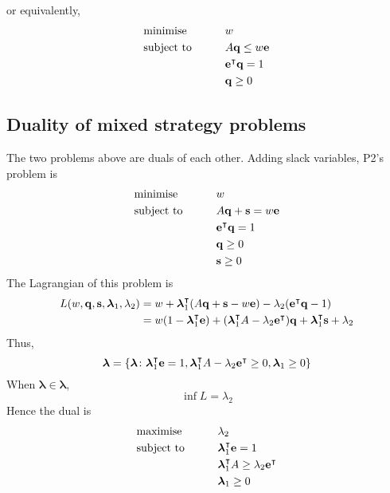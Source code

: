 or equivalently,
\begin{alignat*}{2}
	 & \text{minimise}   & \qquad & w                          \\
	 & \text{subject to} &        & A \vb q \leq w \vb e       \\
	 &                   &        & \vb e^\intercal \vb q = 1 \\
	 &                   &        & \vb q \geq 0
\end{alignat*}

\subsection{Duality of mixed strategy problems}
The two problems above are duals of each other.
Adding slack variables, P2's problem is
\begin{alignat*}{2}
	 & \text{minimise}   & \qquad & w                          \\
	 & \text{subject to} &        & A \vb q + \vb s = w \vb e  \\
	 &                   &        & \vb e^\intercal \vb q = 1 \\
	 &                   &        & \vb q \geq 0               \\
	 &                   &        & \vb s \geq 0
\end{alignat*}
The Lagrangian of this problem is
\begin{align*}
	L(w, \vb q, \vb s, \bm\lambda_1, \lambda_2) & = w + \bm\lambda_1^\intercal (A\vb q + \vb s - w\vb e) - \lambda_2 (\vb e^\intercal \vb q - 1)                                                    \\
	                                            & = w(1 - \bm\lambda_1^\intercal \vb e) + (\bm\lambda_1^\intercal A - \lambda_2 \vb e^\intercal) \vb q + \bm \lambda_1^\intercal\vb s + \lambda_2
\end{align*}
Thus,
\[
	\bm\lambda = \qty{\bm\lambda \colon \bm\lambda_1^\intercal\vb e = 1, \bm\lambda_1^\intercal A - \lambda_2\vb e^\intercal\geq 0, \bm \lambda_1 \geq 0}
\]
When \( \bm\lambda \in \bm\lambda \),
\[
	\inf L = \lambda_2
\]
Hence the dual is
\begin{alignat*}{2}
	 & \text{maximise}   & \qquad & \lambda_2                                                 \\
	 & \text{subject to} &        & \bm\lambda_1^\intercal \vb e = 1                         \\
	 &                   &        & \bm\lambda_1^\intercal A \geq \lambda_2 \vb e^\intercal \\
	 &                   &        & \bm \lambda_1 \geq 0
\end{alignat*}
